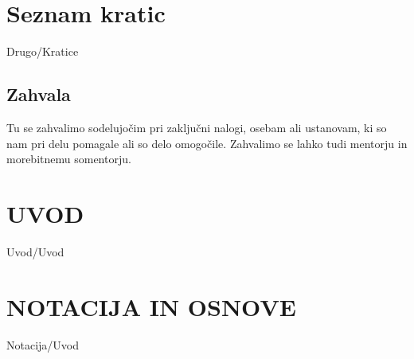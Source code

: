\documentclass[12pt,a4paper,titlepage,openany,twoside]{report}
\begin{document}
\newpage

\tableofcontents
{}
\newpage
\listoftables
{}
\newpage
\listoffigures
{}
\newpage

\chapter*{Seznam kratic}
\thispagestyle{fancyplain}
{Drugo/Kratice}
\newpage

\normalsize



\newpage
\section*{\textbf{Zahvala}}


Tu se zahvalimo sodelujočim pri zaključni nalogi, osebam ali ustanovam, ki so nam pri delu pomagale ali so delo omogočile. Zahvalimo se lahko tudi mentorju in morebitnemu somentorju.


% 
% 

\chapter{UVOD}\label{sec:uvod}
\thispagestyle{fancy} %

{Uvod/Uvod}

\chapter{NOTACIJA IN OSNOVE}\label{sec:Notacija}
\thispagestyle{fancy} 
{Notacija/Uvod}
\end{document}
